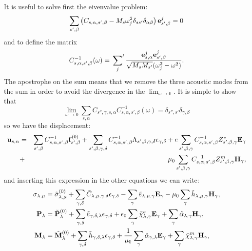 \documentclass[12pt,a4paper,twoside]{report}
\begin{document}
It is useful to solve first the eivenvalue problem:
\begin{equation}
\sum_{s',\beta} \left(C_{s,\alpha,s',\beta} - 
M_s \omega_j^2 \delta_{ss'}\delta_{\alpha\beta}\right){\bf e}^j_{s',\beta}=0
\end{equation}
and to define the matrix 
\begin{equation}
C^{-1}_{s,\alpha,s',\beta}(\omega) = \sideset{}{'}\sum_j {{\bf e}^j_{s,\alpha} 
{\bf e}^j_{s',\beta}
\over \sqrt{M_s M_{s'}}(\omega^2_j - \omega^2)}.
\end{equation}
The apostrophe on the sum means that we remove the three acoustic modes 
from the sum in order to avoid the divergence in the
$\lim_{\omega\rightarrow 0}$. 
It is simple to show that
\begin{equation}
\lim_{\omega\rightarrow 0} \sum_{s,\alpha} C_{s'',\gamma,s,\alpha} C^{-1}_{s,\alpha,s',\beta}(\omega)
=\delta_{s'',s'} \delta_{\gamma,\beta}
\end{equation}
so we have the displacement:
\begin{eqnarray}
{\bf u}_{s,\alpha}&=&\sum_{s',\beta} C^{-1}_{s,\alpha,s',\beta}
{\bf f}^{(0)}_{s',\beta} + \sum_{s',\beta,\gamma,\delta} 
C^{-1}_{s,\alpha,s',\beta}
\Lambda_{s',\beta,\gamma,\delta} \epsilon_{\gamma,\delta}
+ e \sum_{s',\beta,\gamma} C^{-1}_{s,\alpha,s',\beta}
Z^*_{s',\beta,\gamma} {\bf E}_{\gamma} \nonumber \\
&+& \mu_0 \sum_{s',\beta,\gamma} C^{-1}_{s,\alpha,s',\beta} 
Z^m_{s',\beta,\gamma} 
{\bf H}_{\gamma},
\end{eqnarray}
and inserting this expression in the other equations we can write:
\begin{align}
\sigma_{\lambda,\mu}&= \tilde \sigma_{\lambda,\mu}^{(0)}
+\sum_{\gamma,\delta} \tilde C_{\lambda,\mu,\gamma,\delta}  
\epsilon_{\gamma,\delta} -
\sum_{\gamma} \tilde e_{\lambda,\mu,\gamma} 
 {\bf E}_{\gamma}
-\mu_0 \sum_{\gamma}  \tilde h_{\lambda,\mu,\gamma} 
{\bf H}_{\gamma}, \\
{\bf P}_{\lambda}&= \tilde {\bf P}^{(0)}_{\lambda}
+\sum_{\gamma,\delta} \tilde e_{\gamma,\delta,\lambda} 
\epsilon_{\gamma,\delta} +
\epsilon_0 \sum_{\gamma} 
\tilde \chi^e_{\lambda,\gamma}
{\bf E}_{\gamma} +
\sum_{\gamma} \tilde \alpha_{\lambda,\gamma} 
{\bf H}_{\gamma}, \\
{\bf M}_{\lambda}&= \tilde {\bf M}^{(0)}_{\lambda}
+\sum_{\gamma,\delta}  \tilde h_{\gamma,\delta,\lambda} 
\epsilon_{\gamma,\delta} 
+{1\over \mu_0} \sum_{\gamma} \tilde \alpha_{\gamma,\lambda} {\bf E}_{\gamma}
+\sum_{\gamma} 
\tilde \chi^m_{\lambda,\gamma}
{\bf H}_{\gamma},
\end{align}
\end{document}
